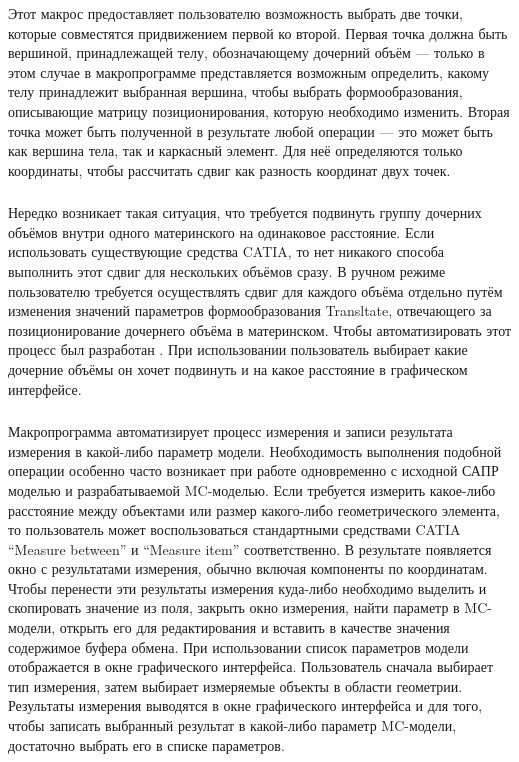 Этот макрос предоставляет пользователю возможность выбрать две точки, которые совместятся придвижением первой ко второй. Первая точка должна быть вершиной, принадлежащей телу, обозначающему дочерний объём --- только в этом случае в макропрограмме представляется возможным определить, какому телу принадлежит выбранная вершина, чтобы выбрать формообразования, описывающие матрицу позиционирования, которую необходимо изменить. Вторая точка может быть полученной в результате любой операции --- это может быть как вершина тела, так и каркасный элемент. Для неё определяются только координаты, чтобы рассчитать сдвиг как разность координат двух точек.

\subsubsection{}\label{sec:secMacroMover}

Нередко возникает такая ситуация, что требуется подвинуть группу дочерних объёмов внутри одного материнского на одинаковое расстояние. Если использовать существующие средства CATIA, то нет никакого способа выполнить этот сдвиг для нескольких объёмов сразу. В ручном режиме пользователю требуется осуществлять сдвиг для каждого объёма отдельно путём изменения значений параметров формообразования Transltate, отвечающего за позиционирование дочернего объёма в материнском. Чтобы автоматизировать этот процесс был разработан . При использовании  пользователь выбирает какие дочерние объёмы он хочет подвинуть и на какое расстояние в графическом интерфейсе.

\subsubsection{}\label{sec:secMacroMeasure}

Макропрограмма  автоматизирует процесс измерения и записи результата измерения в какой-либо параметр модели. Необходимость выполнения подобной операции особенно часто возникает при работе одновременно с исходной САПР моделью и разрабатываемой MC-моделью. Если требуется измерить какое-либо расстояние между объектами или размер какого-либо геометрического элемента, то пользователь может воспользоваться стандартными средствами CATIA ``Measure between'' и ``Measure item'' соответственно. В результате появляется окно с результатами измерения, обычно включая компоненты по координатам. Чтобы перенести эти результаты измерения куда-либо необходимо выделить и скопировать значение из поля, закрыть окно измерения, найти параметр в MC-модели, открыть его для редактирования и вставить в качестве значения содержимое буфера обмена. При использовании  список параметров модели отображается в окне графического интерфейса. Пользователь сначала выбирает тип измерения, затем выбирает измеряемые объекты в области геометрии. Результаты измерения выводятся в окне графического интерфейса и для того, чтобы записать выбранный результат в какой-либо параметр MC-модели, достаточно выбрать его в списке параметров.

